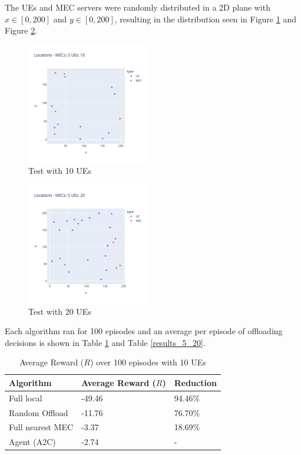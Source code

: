 The UEs and MEC servers were randomly distributed in a 2D plane with $x \in [0, 200]$ and $y \in [0, 200]$, resulting in the distribution seen in Figure \ref{5_10_layout} and Figure \ref{5_20_layout}.

\begin{minipage}{0.5\textwidth}
\begin{figure}[H]
  \centering
  \includegraphics[width=200px]{images/5_10_layout.png}
  \caption{Test with 10 \acrshort{UE}s}  \label{5_10_layout}
\end{figure}
\end{minipage}
\begin{minipage}{0.5\textwidth}
\begin{figure}[H]
  \centering
  \includegraphics[width=200px]{images/5_20_layout.png}
  \caption{Test with 20 \acrshort{UE}s}  \label{5_20_layout}
\end{figure}
\end{minipage}

\break
Each algorithm ran for 100 episodes and an average per episode of offloading decisions is shown in Table \ref{results_5_10} and Table \ref{results_5_20}.

\begin{table}[H]
\centering
\begin{tabular}{|l|l|l|}
\hline
Algorithm        & Average Reward ($R$) & Reduction\\ \hline
Full local       & -49.46 & 94.46\%\\
Random Offload   & -11.76 & 76.70\%\\
Full nearest MEC & -3.37 & 18.69\%\\ 
Agent (A2C) & -2.74 & -\\ \hline
\end{tabular}
\caption{Average Reward ($R$) over 100 episodes with 10 \acrshort{UE}s} \label{results_5_10}
\end{table}

